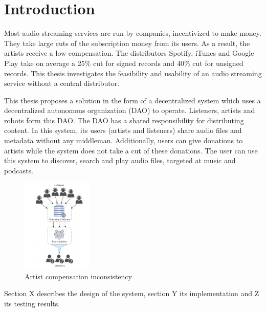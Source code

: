\chapter{Introduction}
\label{introduction}
Most audio streaming services are run by companies, incentivized to make money. They take large cuts of the subscription money from its users. As a result, the artists receive a low compensation. The distributors Spotify, iTunes and Google Play take on average a 25\% cut for signed records and 40\% cut for unsigned records. This thesis investigates the feasibility and usability of an audio streaming service without a central distributor.

This thesis proposes a solution in the form of a decentralized system which uses a decentralized autonomous organization (DAO) to operate. Listeners, artists and robots form this DAO. The DAO has a shared responsibility for distributing content. In this system, its users (artists and listeners) share audio files and metadata without any middleman. Additionally, users can give donations to artists while the system does not take a cut of these donations. The user can use this system to discover, search and play audio files, targeted at music and podcasts.

\begin{figure}
	\includegraphics[width=0.3\textwidth]{introduction/problem-image.png}
	\caption{Artist compensation inconsistency}
\end{figure}

Section X describes the design of the system, section Y its implementation and Z its testing results.

